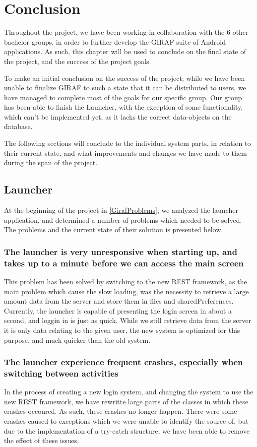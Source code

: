 \chapter{Conclusion}
Throughout the project, we have been working in collaboration with the 6 other
bachelor groups, in order to further develop the GIRAF suite of Android
applications. As such, this chapter will be used to conclude on the final state
of the project, and the success of the project goals.\nl

To make an initial conclusion on the success of the project; while we have been
unable to finalize GIRAF to such a state that it can be distributed to users, we
have managed to complete most of the goals for our specific group. Our group has
been able to finish the Launcher, with the exception of some functionality,
which can't be implemented yet, as it lacks the correct data-objects on the
database.\nl

The following sections will conclude to the individual system parts, in relation
to their current state, and what improvements and changes we have made to them
during the span of the project.

\section{Launcher}
At the beginning of the project in \autoref{GirafProblems}, we analyzed the
launcher application, and determined a number of problems which needed to be
solved. The problems and the current state of their solution is presented
below.

\subsection*{The launcher is very unresponsive when starting up, and takes up to
a minute before we can access the main screen}
 This problem has been solved by
switching to the new REST framework, as the main problem which cause the slow
loading, was the necessity to retrieve a large amount data from the server
and store them in files and sharedPreferences. Currently, the launcher
is capable of presenting the login screen in about a second, and loggin in is just as quick.
While we still retrieve data from the server it is only data relating to the
given user, the new system is optimized for this purpose, and much quicker than the old system.

\subsection*{The launcher experience frequent crashes, especially when switching between
activities}
In the process of creating a new login system, and changing the
system to use the new REST framework, we have rewritte large parts of the
classes in which these crashes occoured. As such, these crashes no longer
happen. There were some crashes caused to exceptions which we were unable to
identify the source of, but due to the implementation of a try-catch structure,
we have been able to remove the effect of these issues.

